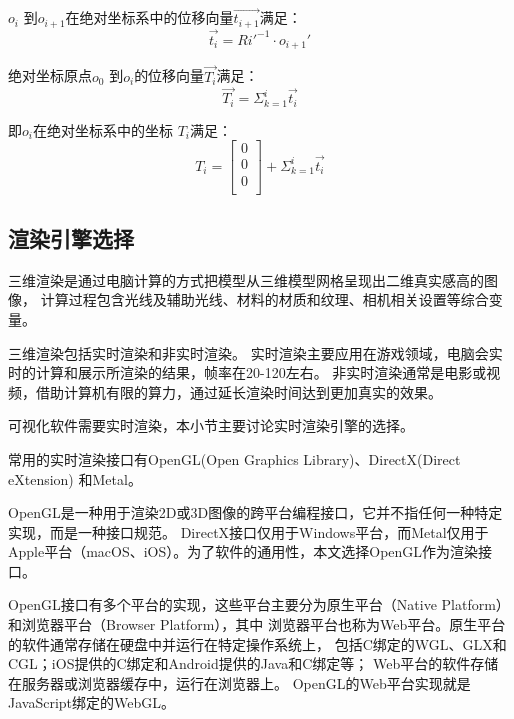 $o_i$ 到$o_{i+1}$在绝对坐标系中的位移向量$\vec{t_{i+1}}$满足：
    \begin{equation}
    \vec{t_i} = Ri'^{-1}\cdot o_{i+1}'
    \end{equation}

绝对坐标原点$o_0$ 到$o_i$的位移向量$\vec{T_i}$满足：
    \begin{equation}
    \vec{T_i} = \Sigma_{k=1} ^ {i} \vec{t_i}
    \end{equation}

即$o_i$在绝对坐标系中的坐标 $T_i$满足\cite{用于光纤光栅曲线重建算法的坐标点拟合}：
\begin{equation}
T_i = \left[
    \begin{matrix}
    0\\
    0\\
    0\\
  	\end{matrix}
  \right]
  + \Sigma_{k=1} ^ {i} \vec{t_i}
\end{equation}
\FloatBarrier

\subsection{渲染引擎选择}
\label{sec:render}

三维渲染是通过电脑计算的方式把模型从三维模型网格呈现出二维真实感高的图像\cite{3DModels_SurveyPaper}，
计算过程包含光线及辅助光线、材料的材质和纹理、相机相关设置等综合变量\cite{scientce-of-3d-rendering}。

三维渲染包括实时渲染和非实时渲染。
实时渲染主要应用在游戏领域，电脑会实时的计算和展示所渲染的结果，帧率在20-120左右。
非实时渲染通常是电影或视频，借助计算机有限的算力，通过延长渲染时间达到更加真实的效果。

可视化软件需要实时渲染，本小节主要讨论实时渲染引擎的选择。

常用的实时渲染接口有OpenGL(Open Graphics Library)\cite{opengl}、DirectX(Direct eXtension)\cite{directx}
和Metal\cite{metal}。

OpenGL是一种用于渲染2D或3D图像的跨平台编程接口\cite{opengl}，它并不指任何一种特定实现，而是一种接口规范。
DirectX接口仅用于Windows平台，而Metal仅用于Apple平台（macOS、iOS）。为了软件的通用性，本文选择OpenGL作为渲染接口。

OpenGL接口有多个平台的实现，这些平台主要分为原生平台（Native Platform）和浏览器平台（Browser Platform），其中
浏览器平台也称为Web平台。原生平台的软件通常存储在硬盘中并运行在特定操作系统上，
包括C绑定的WGL、GLX和CGL；iOS提供的C绑定和Android提供的Java和C绑定等；
Web平台的软件存储在服务器或浏览器缓存中，运行在浏览器上。
OpenGL的Web平台实现就是JavaScript绑定的WebGL。

